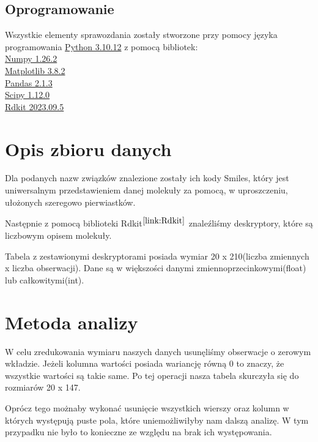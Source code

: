 \documentclass[12pt, a4paper]{article}
\begin{document}
    \subsection{Oprogramowanie}
        Wszystkie elementy sprawozdania zostały stworzone przy pomocy języka programowania \href{https://docs.python.org/3.10/}{Python 3.10.12} z pomocą bibliotek:\\
        \href{https://numpy.org/doc/1.26/}{Numpy 1.26.2}\\
        \href{https://matplotlib.org/3.8.2/index.html}{Matplotlib 3.8.2}\\
        \href{https://pandas.pydata.org/pandas-docs/version/2.1.3/}{Pandas 2.1.3}\\
        \href{https://docs.scipy.org/doc/scipy-1.12.0/}{Scipy 1.12.0}\\
        \href{https://www.rdkit.org/docs/index.html}{Rdkit 2023.09.5}
        \label{link:Rdkit}



\section{Opis zbioru danych}

    Dla podanych nazw związków znalezione zostały ich kody Smiles, który jest 
    uniwersalnym przedstawieniem danej molekuły za pomocą, w uproszczeniu, ułożonych szeregowo pierwiastków.
    
    Następnie z pomocą biblioteki Rdkit$^{\ref{link:Rdkit}}$ znaleźliśmy deskryptory, które są liczbowym opisem molekuły.
    
    Tabela z zestawionymi deskryptorami posiada wymiar 20 x 210(liczba zmiennych x liczba obserwacji). Dane są w większości danymi
    zmiennoprzecinkowymi(float) lub całkowitymi(int).

\section{Metoda analizy}

    W celu zredukowania wymiaru naszych danych usunęliśmy obserwacje o zerowym wkładzie.
    Jeżeli kolumna wartości posiada wariancję równą 0 to znaczy, że wszystkie wartości są takie same.
    Po tej operacji nasza tabela skurczyła się do rozmiarów 20 x 147.
    
    Oprócz tego możnaby wykonać usunięcie wszystkich wierszy oraz kolumn w których występują puste pola, które
    uniemożliwiłyby nam dalszą analizę. W tym przypadku nie było to konieczne ze względu na brak ich występowania.
\end{document}
